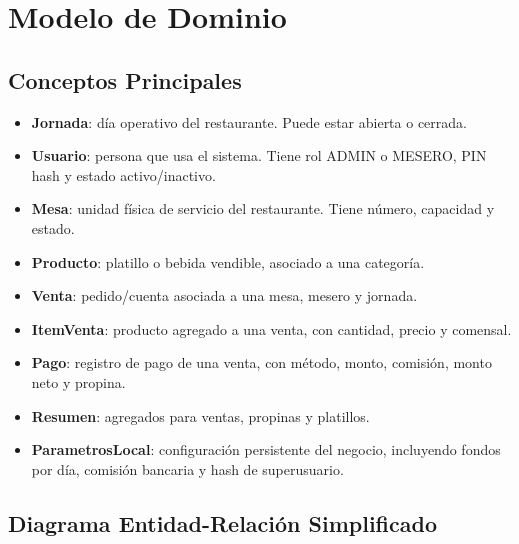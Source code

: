 \documentclass[11pt,letterpaper,openany]{report}
\begin{document}
\chapter{Modelo de Dominio}

\section{Conceptos Principales}

\begin{itemize}[leftmargin=*]
  \item \textbf{Jornada}: día operativo del restaurante. Puede estar abierta o cerrada.
  \item \textbf{Usuario}: persona que usa el sistema. Tiene rol ADMIN o MESERO, PIN hash y estado activo/inactivo.
  \item \textbf{Mesa}: unidad física de servicio del restaurante. Tiene número, capacidad y estado.
  \item \textbf{Producto}: platillo o bebida vendible, asociado a una categoría.
  \item \textbf{Venta}: pedido/cuenta asociada a una mesa, mesero y jornada.
  \item \textbf{ItemVenta}: producto agregado a una venta, con cantidad, precio y comensal.
  \item \textbf{Pago}: registro de pago de una venta, con método, monto, comisión, monto neto y propina.
  \item \textbf{Resumen}: agregados para ventas, propinas y platillos.
  \item \textbf{ParametrosLocal}: configuración persistente del negocio, incluyendo fondos por día, comisión bancaria y hash de superusuario.
\end{itemize}

\section{Diagrama Entidad-Relación Simplificado}
\end{document}
